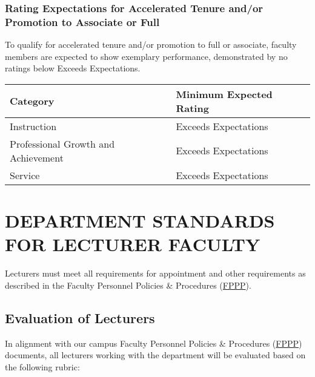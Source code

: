 \documentclass{scrartcl}
\begin{document}
\subsubsection{Rating Expectations for Accelerated Tenure and/or Promotion to Associate or Full}
To qualify for accelerated tenure and/or promotion to full or associate, faculty members are expected to show exemplary performance, demonstrated by no ratings below Exceeds Expectations.

\begin{longtable}{p{7cm}p{7cm}}

\hline
\textbf{Category} & \textbf{Minimum Expected Rating} \\
\hline
\endhead %
Instruction 	& Exceeds Expectations \\ \hline
Professional Growth and Achievement 	& Exceeds Expectations \\ \hline
Service 	& Exceeds Expectations \\ \hline
\end{longtable}

\section{DEPARTMENT STANDARDS FOR LECTURER FACULTY}
Lecturers must meet all requirements for appointment and other requirements as described in the Faculty Personnel Policies \& Procedures (\href{https://www.csuchico.edu/oapl/fppp.shtml}{FPPP}).
\subsection{Evaluation of Lecturers}
In alignment with our campus Faculty Personnel Policies \& Procedures (\href{https://www.csuchico.edu/oapl/fppp.shtml}{FPPP}) documents, all lecturers working with the department will be evaluated based on the following rubric:
\end{document}
